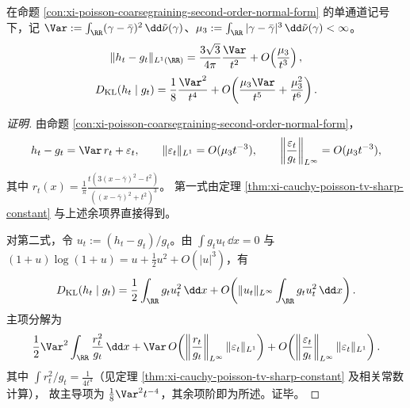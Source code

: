 \begin{conclusion}\label{con:xi-poisson-cauchy-second-order-constants-with-mu3-remainder}
在命题 \ref{con:xi-poisson-coarsegraining-second-order-normal-form} 的单通道记号下，记 \(\Var:=\int_{\RR}(\gamma-\bar\gamma)^2\,\dd\tilde\nu(\gamma)\)、\(\mu_3:=\int_{\RR}|\gamma-\bar\gamma|^3\,\dd\tilde\nu(\gamma)<\infty\)。
\[
\|h_t-g_t\|_{L^1(\RR)}
=\frac{3\sqrt3}{4\pi}\frac{\Var}{t^2}
+O\!\left(\frac{\mu_3}{t^3}\right),
\]
\[
D_{\mathrm{KL}}(h_t\mid g_t)
=\frac{1}{8}\frac{\Var^2}{t^4}
+O\!\left(\frac{\mu_3\Var}{t^5}+\frac{\mu_3^2}{t^6}\right).
\]
\end{conclusion}
\begin{proof}[证明]
由命题 \ref{con:xi-poisson-coarsegraining-second-order-normal-form}，
\[
h_t-g_t=\Var\,r_t+\varepsilon_t,\qquad
\|\varepsilon_t\|_{L^1}=O(\mu_3 t^{-3}),\qquad
\left\|\frac{\varepsilon_t}{g_t}\right\|_{L^\infty}=O(\mu_3 t^{-3}),
\]
其中
\(
r_t(x)=\frac{1}{\pi}\frac{t(3(x-\bar\gamma)^2-t^2)}{((x-\bar\gamma)^2+t^2)^3}
\)。
第一式由定理 \ref{thm:xi-cauchy-poisson-tv-sharp-constant} 与上述余项界直接得到。

对第二式，令 \(u_t:=(h_t-g_t)/g_t\)。由 \(\int g_tu_t\,\dd x=0\) 与
\(
(1+u)\log(1+u)=u+\frac12u^2+O(|u|^3)
\)，有
\[
D_{\mathrm{KL}}(h_t\mid g_t)
=\frac12\int_{\RR}g_tu_t^2\,\dd x
+O\!\left(\|u_t\|_{L^\infty}\int_{\RR}g_tu_t^2\,\dd x\right).
\]
主项分解为
\[
\frac12\Var^2\int_{\RR}\frac{r_t^2}{g_t}\,\dd x
+\Var\,O\!\left(\left\|\frac{r_t}{g_t}\right\|_{L^\infty}\|\varepsilon_t\|_{L^1}\right)
+O\!\left(\left\|\frac{\varepsilon_t}{g_t}\right\|_{L^\infty}\|\varepsilon_t\|_{L^1}\right).
\]
其中 \(\int r_t^2/g_t=\frac{1}{4t^4}\)（见定理 \ref{thm:xi-cauchy-poisson-tv-sharp-constant} 及相关常数计算），
故主导项为 \(\frac18\Var^2t^{-4}\)，其余项阶即为所述。证毕。
\end{proof}

